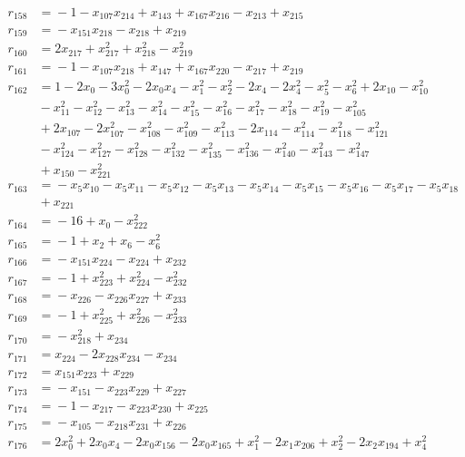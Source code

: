 \begin{align*}
r_{158} &={}-1 -x_{107}x_{214} +x_{143} +x_{167}x_{216} -x_{213} +x_{215} \\
r_{159} &={}-x_{151}x_{218} -x_{218} +x_{219} \\
r_{160} &={}2x_{217} +x_{217}^{2} +x_{218}^{2} -x_{219}^{2} \\
r_{161} &={}-1 -x_{107}x_{218} +x_{147} +x_{167}x_{220} -x_{217} +x_{219} \\
r_{162} &={}1 -2x_{0} -3x_{0}^{2} -2x_{0}x_{4} -x_{1}^{2} -x_{2}^{2} -2x_{4} -2x_{4}^{2} -x_{5}^{2} -x_{6}^{2} +2x_{10} -x_{10}^{2} \\
&{}-x_{11}^{2} -x_{12}^{2} -x_{13}^{2} -x_{14}^{2} -x_{15}^{2} -x_{16}^{2} -x_{17}^{2} -x_{18}^{2} -x_{19}^{2} -x_{105}^{2} \\
&{}+2x_{107} -2x_{107}^{2} -x_{108}^{2} -x_{109}^{2} -x_{113}^{2} -2x_{114} -x_{114}^{2} -x_{118}^{2} -x_{121}^{2} \\
&{}-x_{124}^{2} -x_{127}^{2} -x_{128}^{2} -x_{132}^{2} -x_{135}^{2} -x_{136}^{2} -x_{140}^{2} -x_{143}^{2} -x_{147}^{2} \\
&{}+x_{150} -x_{221}^{2} \\
r_{163} &={}-x_{5}x_{10} -x_{5}x_{11} -x_{5}x_{12} -x_{5}x_{13} -x_{5}x_{14} -x_{5}x_{15} -x_{5}x_{16} -x_{5}x_{17} -x_{5}x_{18} \\
&{}+x_{221} \\
r_{164} &={}-16 +x_{0} -x_{222}^{2} \\
r_{165} &={}-1 +x_{2} +x_{6} -x_{6}^{2} \\
r_{166} &={}-x_{151}x_{224} -x_{224} +x_{232} \\
r_{167} &={}-1 +x_{223}^{2} +x_{224}^{2} -x_{232}^{2} \\
r_{168} &={}-x_{226} -x_{226}x_{227} +x_{233} \\
r_{169} &={}-1 +x_{225}^{2} +x_{226}^{2} -x_{233}^{2} \\
r_{170} &={}-x_{218}^{2} +x_{234} \\
r_{171} &={}x_{224} -2x_{228}x_{234} -x_{234} \\
r_{172} &={}x_{151}x_{223} +x_{229} \\
r_{173} &={}-x_{151} -x_{223}x_{229} +x_{227} \\
r_{174} &={}-1 -x_{217} -x_{223}x_{230} +x_{225} \\
r_{175} &={}-x_{105} -x_{218}x_{231} +x_{226} \\
r_{176} &={}2x_{0}^{2} +2x_{0}x_{4} -2x_{0}x_{156} -2x_{0}x_{165} +x_{1}^{2} -2x_{1}x_{206} +x_{2}^{2} -2x_{2}x_{194} +x_{4}^{2} \\

\end{align*}
